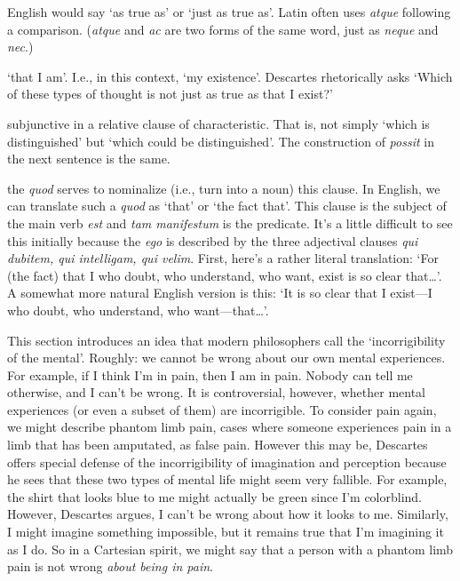  English would say `as true as' or `just as true as'. Latin often uses \textit{atque} following a comparison. (\textit{atque} and \textit{ac} are two forms of the same word, just as \textit{neque} and \textit{nec}.)

 `that I am'. I.e., in this context, `my existence'. Descartes rhetorically asks `Which of these types of thought is not just as true as that I exist?'

 subjunctive in a relative clause of characteristic. That is, not simply `which is distinguished' but `which could be distinguished'. The construction of \textit{possit} in the next sentence is the same.

 the \textit{quod} serves to nominalize (i.e., turn into a noun) this clause. In English, we can translate such a \textit{quod} as `that' or `the fact that'. This clause is the subject of the main verb \textit{est} and \textit{tam manifestum} is the predicate. It's a little difficult to see this initially because the \textit{ego} is described by the three adjectival clauses \textit{qui dubitem, qui intelligam, qui velim}. First, here's a rather literal translation: `For (the fact) that I who doubt, who understand, who want, exist is so clear that\dots'. A somewhat more natural English version is this: `It is so clear that I exist---I who doubt, who understand, who want---that\dots'.

 This section introduces an idea that modern philosophers call the `incorrigibility of the mental'. Roughly: we cannot be wrong about our own mental experiences. For example, if I think I'm in pain, then I am in pain. Nobody can tell me otherwise, and I can't be wrong. It is controversial, however, whether mental experiences (or even a subset of them) are incorrigible. To consider pain again, we might describe phantom limb pain, cases where someone experiences pain in a limb that has been amputated, as false pain. However this may be, Descartes offers special defense of the incorrigibility of imagination and perception because he sees that these two types of mental life might seem very fallible. For example, the shirt that looks blue to me might actually be green since I'm colorblind. However, Descartes argues, I can't be wrong about how it looks to me. Similarly, I might imagine something impossible, but it remains true that I'm imagining it as I do. So in a Cartesian spirit, we might say that a person with a phantom limb pain is not wrong \textit{about being in pain}.

